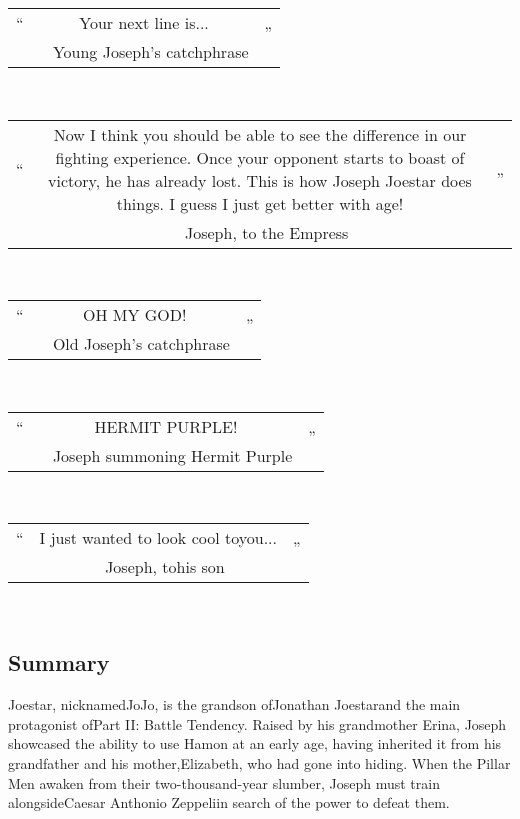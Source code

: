\documentclass[a4paper,12pt]{article}
\begin{document}
\begin{tabular}{|c|c|c|} \hline
“ & Your next line is... & „ \\
 & ~ Young Joseph's catchphrase &  \\
\end{tabular}\\ \par \vspace{0.5cm}

\begin{tabular}{|c|c|c|} \hline
“ & Now I think you should be able to see the difference in our fighting experience. Once your opponent starts to boast of victory, he has already lost. This is how Joseph Joestar does things. I guess I just get better with age! & „ \\
 & ~ Joseph, to the Empress &  \\
\end{tabular}\\ \par \vspace{0.5cm}

\begin{tabular}{|c|c|c|} \hline
“ & OH MY GOD! & „ \\
 & ~ Old Joseph's catchphrase &  \\
\end{tabular}\\ \par \vspace{0.5cm}

\begin{tabular}{|c|c|c|} \hline
“ & HERMIT PURPLE! & „ \\
 & ~ Joseph summoning Hermit Purple &  \\
\end{tabular}\\ \par \vspace{0.5cm}

\begin{tabular}{|c|c|c|} \hline
“ & I just wanted to look cool toyou... & „ \\
 & ~ Joseph, tohis son &  \\
\end{tabular}\\ \par \vspace{0.5cm}

\subsection*{Summary}\n\nJoseph Joestar, nicknamedJoJo, is the grandson ofJonathan Joestarand the main protagonist ofPart II: Battle Tendency. Raised by his grandmother Erina, Joseph showcased the ability to use Hamon at an early age, having inherited it from his grandfather and his mother,Elizabeth, who had gone into hiding. When the Pillar Men awaken from their two-thousand-year slumber, Joseph must train alongsideCaesar Anthonio Zeppeliin search of the power to defeat them.\\ \par \vspace{0.5cm}
\end{document}
